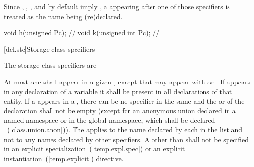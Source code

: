 \pnum
{}%
%
%
%
\begin{note}
Since , , , and 
by default imply , a  appearing after one
of those specifiers is treated as the name being (re)declared.
\begin{example}

\begin{codeblock}
void h(unsigned Pc);            // 
void k(unsigned int Pc);        // 
\end{codeblock}
\end{example}
\end{note}

[dcl.stc]{Storage class specifiers}%
%
%
%
%
%

\pnum
The storage class specifiers are

\begin{bnf}
\br
    \br
    \br
    \br
\end{bnf}

At most one  shall appear in a given
, except that  may appear with  or 
. If  appears in any declaration of
a variable it shall be present in all declarations of that entity. If a 
appears in a , there can be no
 specifier in the same  and
the  or 
of the declaration shall not be
empty (except for an anonymous union declared in a named namespace or in the
global namespace, which shall be declared
%
~(\ref{class.union.anon})). The
 applies to the name declared by each
 in the list and not to any names declared by
other specifiers. A 
other than 
shall not be
specified in an explicit specialization~(\ref{temp.expl.spec}) or an
explicit instantiation~(\ref{temp.explicit}) directive.

